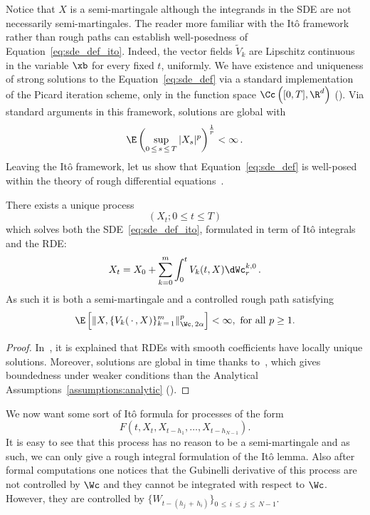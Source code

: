 Notice that $X$ is a semi-martingale although the integrands in the SDE are not necessarily semi-martingales. The reader more familiar with the Itô framework rather than rough paths can establish well-posedness of Equation~\eqref{eq:sde_def_ito}. Indeed, the vector fields $\widetilde{V}_k$ are Lipschitz continuous in the variable $\xb$ for every fixed $t$, uniformly. We have existence and uniqueness of strong solutions to the Equation~\eqref{eq:sde_def} via a standard implementation of the Picard iteration scheme, only in the function space $\Cc\left([0,T], \R^d \right)$ (\cite[see the more general Theorem~4.6]{LiShi2001}). Via standard arguments in this framework, solutions are global with
\[
\E\left(\sup_{0\,\leq\,s\,\leq\,T} |X_s|^p \right)^{\frac{1}{p}} < \infty\,.
\]
Leaving the Itô framework, let us show that Equation~\eqref{eq:sde_def} is well-posed within the theory of rough differential equations~\cite[Chapter~8]{FH14}.

\begin{prop}
There exists a unique process
\[
(X_t ; 0 \leq t \leq T)
\]
which solves both the SDE~\eqref{eq:sde_def_ito}, formulated in term of Itô integrals and the RDE:
\begin{equation}\label{eq:sde_def_rough}
X_t = X_0 + \sum_{k=0}^m \int_0^t V_k(t,X) \dWc^{k,0}_r \, .
\end{equation}
As such it is both a semi-martingale and a controlled rough path satisfying
\[
\E\left[\| X,\{V_k(\,\cdot\,, X)\}_{k\,=\,1}^m\|_{\Wc,\,2\alpha}^p\right] < \infty, \text{ for all }p\geq 1.
\]
\end{prop}


\begin{proof}
In~\cite[Theorem~8.4]{FH14}, it is explained that RDEs with smooth coefficients have locally unique solutions. Moreover, solutions are global in time thanks to~\cite[Proposition~2]{lejay2012global}, which gives boundedness under weaker conditions than the Analytical Assumptions~\ref{assumptions:analytic} (\cite[Hypothesis 1]{lejay2012global}).
\end{proof}

We now want some sort of Itô formula for processes of the form
\[
F(t,X_t,X_{t-h_1},\dots, X_{t-h_{N-1}}).
\]
It is easy to see that this process has no reason to be a semi-martingale and as such, we can only give a rough integral formulation of the Itô lemma. Also after formal computations one notices that the Gubinelli derivative of this process are not controlled by $\Wc$ and they cannot be integrated with respect to $\Wc$. However, they are controlled by $\{W_{t-(h_j\,+\,h_i)}\}_{0\,\leq\,i\,\leq\,j\,\leq\,N-1}$.

